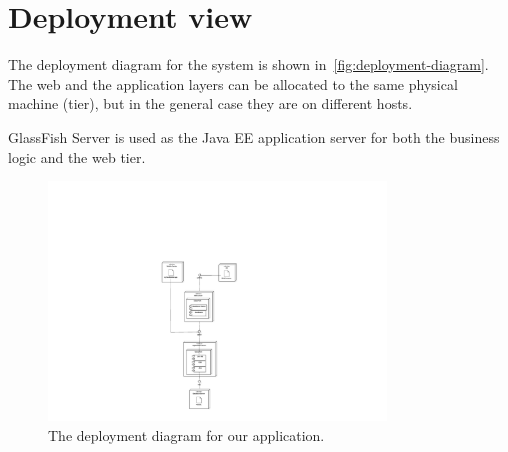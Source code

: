 \section{Deployment view}
\label{sec:deployment-view}

The deployment diagram for the system is shown in~\autoref{fig:deployment-diagram}.
The web and the application layers can be allocated to the same physical machine (tier), but in the general case they are on different hosts.

GlassFish Server is used as the Java EE application server for both the business logic and the web tier.
\begin{figure}[h]
\centering
\includegraphics[width=0.8\textwidth]{diagrams/deployment_diagram}
\caption{The deployment diagram for our application.}
\label{fig:deployment-diagram}
\end{figure}
